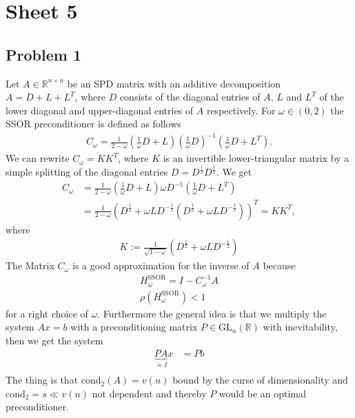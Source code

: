 


\maketitle
\section{Sheet 5}
\subsection{Problem 1}
Let $A \in \mathbb{R}^{n \times n}$ be an SPD matrix with an additive
decomposition $A = D + L + L^T$, where $D$ consists of the diagonal entries
of $A$, $L$ and $L^T$ of the lower diagonal and upper-diagonal entries of $A$
respectively. For $\omega \in(0,2)$ the SSOR preconditioner is defined as
follows
\begin{align}
    C_\omega = \frac{1}{2-\omega}\left( \frac{1}{\omega} D+L\right)
    \left( \frac{1}{\omega} D \right)^{-1}\left( \frac{1}{\omega}D + L^T
    \right).
\end{align}
We can rewrite $C_\omega = KK^T$, where $K$ is an invertible lower-triangular
matrix by a simple splitting of the diagonal entries $D =
D^{\frac{1}{2}}D^{\frac{1}{2}}$. We get
\begin{align}
    C_\omega &= \frac{1}{2-\omega}\left( \frac{1}{\omega}D +L \right)\omega
    D^{-1}\left( \frac{1}{\omega}D + L^T \right)  \\
    &= \frac{1}{2-\omega}\left( D^{\frac{1}{2}} + \omega
    LD^{-\frac{1}{2}}\left( D^{\frac{1}{2}}+\omega LD^{-\frac{1}{2}} \right)
\right)^T = KK^T,
\end{align}
where
\begin{align}
    K := \frac{1}{\sqrt{1-\omega} }\left( D^{\frac{1}{2}} + \omega LD^{-
    \frac{1}{2}} \right)
\end{align}
The Matrix $C_\omega$ is a good approximation for the inverse of $A$ because
\begin{align}
    H^{\text{SSOR}}_\omega = I - C^{-1}_\omega A\\
    \rho(H^{\text{SSOR}}_\omega) < 1
\end{align}
for a right choice of $\omega$. Furthermore the general idea is that we
multiply the system $Ax=b$ with a preconditioning matrix $P \in
\text{GL}_n\left(\mathbb{R}\right)$ with inevitability, then we get the
system
\begin{align}
    \underbrace{PA}_{\approx I}x&= Pb\\
\end{align}
The thing is that $\text{cond}_2(A) = v(n)$ bound by the curse of
dimensionality and $\text{cond}_2 = s \ll v(n)$ not dependent and thereby $P$
would be an optimal preconditioner.
